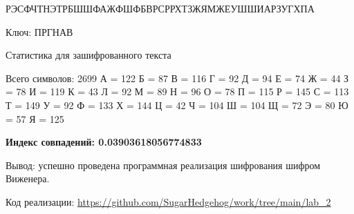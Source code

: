 \documentclass[a4paper, 14pt]{extarticle}
\begin{document}
РЭСФЧТНЭТРБШШФАЖФШФБВРСРРХТЗЖЯМЖЕУШШИАРЗУГХПА

Ключ: ПРГНАВ

Статистика для зашифрованного текста

Всего символов: 2699
А = 122
Б = 87
В = 116
Г = 92
Д = 94
Е = 74
Ж = 44
З = 78
И = 119
К = 43
Л = 92
М = 89
Н = 96
О = 78
П = 115
Р = 145
С = 113
Т = 149
У = 92
Ф = 133
Х = 144
Ц = 42
Ч = 104
Ш = 104
Щ = 72
Э = 80
Ю = 57
Я = 125

\textbf{Индекс совпадений: 0.03903618056774833}

Вывод:  успешно проведена программная реализация шифрования шифром Виженера.

Код реализации: \url{https://github.com/SugarHedgehog/work/tree/main/lab_2}
\end{document}
